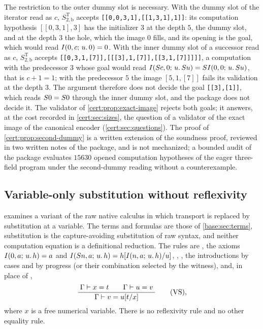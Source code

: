 The restriction to the outer dummy slot is necessary. With the dummy slot of the
iterator read as $c$, $S^{\mathrm T}_{2,\mathrm b}$ accepts
\texttt{[[0,0,3,1],[[1,3,1],1]]}: its computation hypothesis $[[0,3,1],3]$ has the
initializer $3$ at the depth $5$, the dummy slot, and at the depth $3$ the hole, which
the image $0$ fills, and its opening is the goal, which would read
$I(0,c;\,u.\,0)=0$. With the inner dummy slot of a successor read as $c$,
$S^{\mathrm T}_{2,\mathrm b}$ accepts
\texttt{[[0,3,1,[7]],[[[3],1,[7]],[[3,1,[7]]]]]}, a computation with the predecessor
$3$ whose goal would read $I(S c,0;\,u.\,S u)=SI(0,0;\,u.\,S u)$, that is
$c+1=1$; with the predecessor $5$ the image $[5,1,[7]]$ fails its validation at the
depth $3$. The argument therefore does not decide the goal \texttt{[[3],[1]]}, which
reads $S 0=S 0$ through the inner dummy slot, and the package does not decide
it. The validator of \cref{cert:prop:exact-image} rejects both goals; it answers, at
the cost recorded in \cref{cert:sec:sizes}, the question of a validator of the exact
image of the canonical encoder (\cref{cert:sec:questions}). The proof of
\cref{cert:prop:second-dummy} is a written extension of the soundness proof, reviewed
in two written notes of the package, and is not mechanized; a bounded audit of the
package evaluates $15630$ opened computation hypotheses of the eager three-field
program under the second-dummy reading without a counterexample.

\subsection{Variable-only substitution without reflexivity}\label{cert:sec:vs}

 examines a variant of the raw native calculus in
which transport is replaced by substitution at a variable. The terms and
formulas are those of \cref{base:sec:terms}, substitution is the
capture-avoiding substitution of raw syntax, and neither computation equation
is a definitional reduction. The rules are , the axioms
$I(0,a;\,u.\,h)=a$ and $I(S n,a;\,u.\,h)=h[I(n,a;\,u.\,h)/u]$,
, , the introductions by cases and by progress (or
their combination selected by the witness), and, in place of ,
\[
\dfrac{\;\Gamma\vdash x=t\qquad\Gamma\vdash u=v\;}{\;\Gamma\vdash v=u[t/x]\;}
\qquad(\mathrm{VS}),
\]
where $x$ is a free numerical variable. There is no reflexivity rule and no
other equality rule.

